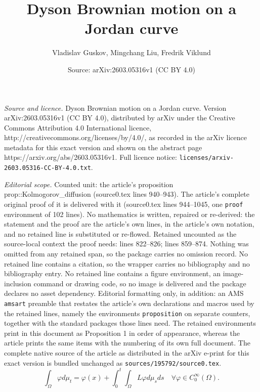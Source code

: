 \documentclass[10pt,a4paper]{amsart}
\title{Dyson Brownian motion on a Jordan curve}
\author{Vladislav Guskov, Mingchang Liu, Fredrik Viklund}
\date{Source: arXiv:2603.05316v1 (CC BY 4.0)}
\begin{document}
\maketitle

\noindent\emph{Source and licence.} Dyson Brownian motion on a Jordan curve. Version arXiv:2603.05316v1 (CC BY 4.0), distributed by arXiv under the Creative Commons Attribution 4.0 International licence, http://creativecommons.org/licenses/by/4.0/, as recorded in the arXiv licence metadata for this exact version and shown on the abstract page https://arxiv.org/abs/2603.05316v1. Full licence notice: \texttt{licenses/arxiv-2603.05316-CC-BY-4.0.txt}.\par\smallskip

\noindent\textit{Editorial scope.} Counted unit: the article's proposition prop::Kolmogorov\_diffusion (source0.tex lines 940--943). The article's complete original proof of it is delivered with it (source0.tex lines 944--1045, one \texttt{proof} environment of 102 lines). No mathematics is written, repaired or re-derived: the statement and the proof are the article's own lines, in the article's own notation, and no retained line is substituted or re-flowed.  Retained uncounted as the source-local context the proof needs: lines 822--826; lines 859--874.  Nothing was omitted from any retained span, so the package carries no omission record.  No retained line contains a citation, so the wrapper carries no bibliography and no bibliography entry.  No retained line contains a figure environment, an image-inclusion command or drawing code, so no image is delivered and the package declares no asset dependency.  Editorial formatting only, in addition: an AMS \texttt{amsart} preamble that restates the article's own declarations and macros used by the retained lines, namely the environments \texttt{proposition} on separate counters, together with the standard packages those lines need.  The retained environments print in this document as Proposition 1 in order of appearance, whereas the article prints the same items with the numbering of its own full document.  The complete native source of the article as distributed in the arXiv e-print for this exact version is bundled unchanged as \texttt{sources/195792/source0.tex}.
\begin{equation}\label{eq::Cauchy_probem_x}
    \int_{\Omega}\varphi d\mu_{t} 
    = \varphi(x) + \int_{0}^{t}\int_{\Omega}L\varphi d\mu_{s}ds
    \quad\forall \varphi\in C^{\infty}_{0}(\Omega).
\end{equation}    
\end{document}
